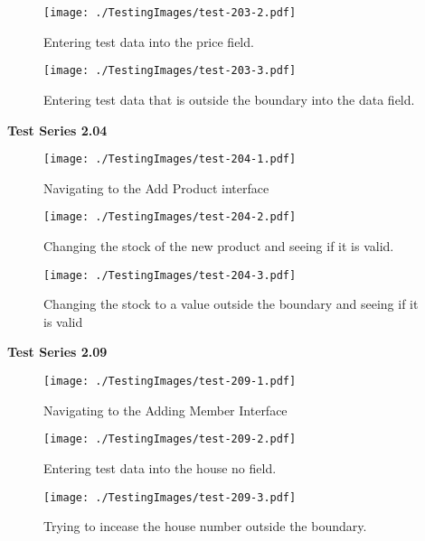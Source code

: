\begin{figure}[H]
    \texttt{[image: ./TestingImages/test-203-2.pdf]}
    \caption{Entering test data into the price field.}  \label{fig:test-203-2}
\end{figure}

\begin{figure}[H]
    \texttt{[image: ./TestingImages/test-203-3.pdf]}
    \caption{Entering test data that is outside the boundary into the data field.}  \label{fig:test-203-3}
\end{figure}

\pagebreak

\textbf{Test Series 2.04}

\begin{figure}[H]
    \texttt{[image: ./TestingImages/test-204-1.pdf]}
    \caption{Navigating to the Add Product interface}  \label{fig:test-204-1}
\end{figure}

\begin{figure}[H]
    \texttt{[image: ./TestingImages/test-204-2.pdf]}
    \caption{Changing the stock of the new product and seeing if it is valid.}  \label{fig:test-204-2}
\end{figure}

\begin{figure}[H]
    \texttt{[image: ./TestingImages/test-204-3.pdf]}
    \caption{Changing the stock to a value outside the boundary and seeing if it is valid}  \label{fig:test-204-3}
\end{figure}

\pagebreak

\textbf{Test Series 2.09}

\begin{figure}[H]
    \texttt{[image: ./TestingImages/test-209-1.pdf]}
    \caption{Navigating to the Adding Member Interface}  \label{fig:test-209-1}
\end{figure}

\begin{figure}[H]
    \texttt{[image: ./TestingImages/test-209-2.pdf]}
    \caption{Entering test data into the house no field.}  \label{fig:test-209-2}
\end{figure}

\begin{figure}[H]
    \texttt{[image: ./TestingImages/test-209-3.pdf]}
    \caption{Trying to incease the house number outside the boundary.}  \label{fig:test-209-3}
\end{figure}


